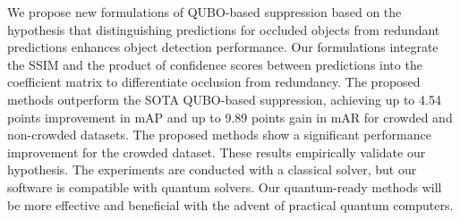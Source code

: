 We propose new formulations of QUBO-based suppression based on the hypothesis that distinguishing predictions for occluded objects from redundant predictions enhances object detection performance.
Our formulations integrate the SSIM and the product of confidence scores between predictions into the coefficient matrix to differentiate occlusion from redundancy.
The proposed methods outperform the SOTA QUBO-based suppression, achieving up to 4.54 points improvement in mAP and up to 9.89 points gain in mAR for crowded and non-crowded datasets.
The proposed methods show a significant performance improvement for the crowded dataset. These results empirically validate our hypothesis.
The experiments are conducted with a classical solver, but our software is compatible with quantum solvers. Our quantum-ready methods will be more effective and beneficial with the advent of practical quantum computers.
